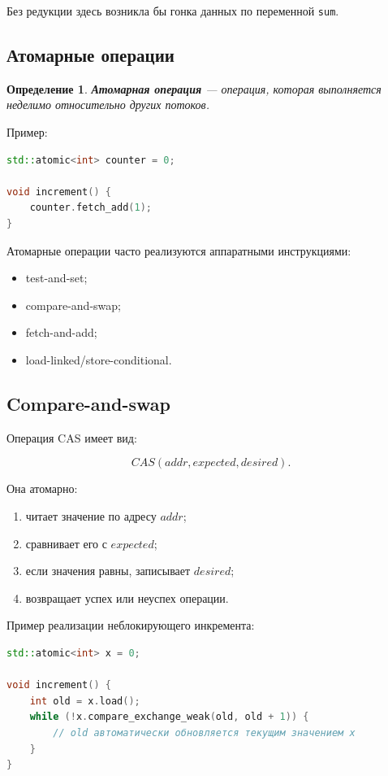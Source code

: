 \documentclass[12pt,a4paper]{article}
\newtheorem{definition}{Определение}
\begin{document}
Без редукции здесь возникла бы гонка данных по переменной \texttt{sum}.

\subsection{Атомарные операции}

\begin{definition}
\textbf{Атомарная операция} --- операция, которая выполняется неделимо относительно других потоков.
\end{definition}

Пример:

\begin{lstlisting}[language=C++]
std::atomic<int> counter = 0;

void increment() {
    counter.fetch_add(1);
}
\end{lstlisting}

Атомарные операции часто реализуются аппаратными инструкциями:
\begin{itemize}
    \item test-and-set;
    \item compare-and-swap;
    \item fetch-and-add;
    \item load-linked/store-conditional.
\end{itemize}

\subsection{Compare-and-swap}

Операция CAS имеет вид:

\[
CAS(addr, expected, desired).
\]

Она атомарно:
\begin{enumerate}
    \item читает значение по адресу $addr$;
    \item сравнивает его с $expected$;
    \item если значения равны, записывает $desired$;
    \item возвращает успех или неуспех операции.
\end{enumerate}

Пример реализации неблокирующего инкремента:

\begin{lstlisting}[language=C++]
std::atomic<int> x = 0;

void increment() {
    int old = x.load();
    while (!x.compare_exchange_weak(old, old + 1)) {
        // old автоматически обновляется текущим значением x
    }
}
\end{lstlisting}
\end{document}
